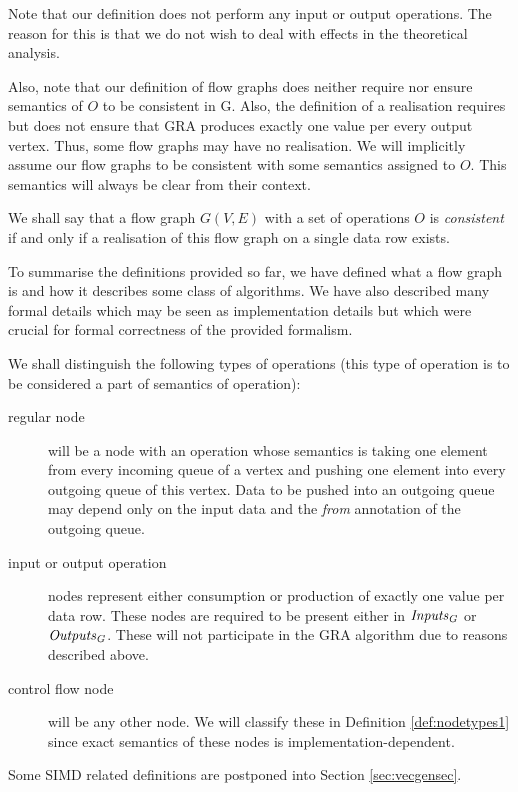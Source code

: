 Note that our definition does not perform any input or output operations. The reason for this is that we do not wish to deal with effects in the theoretical analysis.


Also, note that our definition of flow graphs does neither require nor ensure semantics of $O$ to be consistent in G. Also, the definition of a realisation requires but does not ensure that GRA produces exactly one value per every output vertex. Thus, some flow graphs may have no realisation. We will implicitly assume our flow graphs to be consistent with some semantics assigned to $O$. This semantics will always be clear from their context.


  We shall say that a flow graph $G(V,E)$ with a set of operations $O$ is \emph{consistent} if and only if a realisation of this flow graph on a single data row exists. 
\myenddef


To summarise the definitions provided so far, we have defined what a flow graph is and how it describes some class of algorithms. We have also described many formal details which may be seen as implementation details but which were crucial for formal correctness of the provided formalism.

  We shall distinguish the following types of operations (this type of operation is to be considered a part of semantics of operation):
\begin{description}
  \item [regular node] will be a node with an operation whose semantics is taking one element from every incoming queue of a vertex and pushing one element into every outgoing queue of this vertex. Data to be pushed into an outgoing queue may depend only on the input data and the \emph{from} annotation of the outgoing queue.
  \item [input or output operation] nodes represent either consumption or production of exactly one value per data row. These nodes are required to be present either in $\mf{inputs_G}$ or $\mf{outputs_G}$. These will not participate in the GRA algorithm due to reasons described above.
\item [control flow node] will be any other node. We will classify these in Definition \ref{def:nodetypes1} since exact semantics of these nodes is implementation-dependent. 
\end{description}
\myenddef

  Some SIMD related definitions are postponed into Section \ref{sec:vecgensec}.


